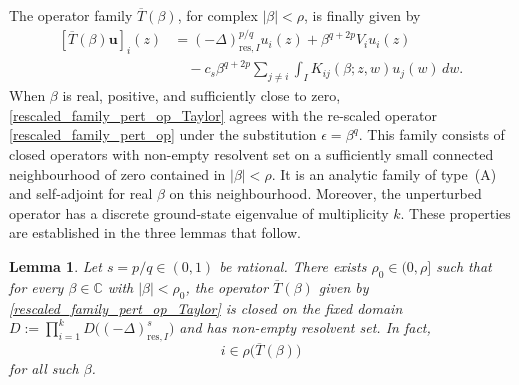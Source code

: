 \documentclass[preprint,12pt]{elsarticle}
\newcommand{\fvect}[1]{\mathbf{#1}}
\newtheorem{lemma}[theorem]{Lemma}
\begin{document}
The operator family $\overline{T}(\beta)$, for complex
$|\beta|<\rho$, is finally given by
\begin{align}\label{rescaled_family_pert_op_Taylor}
    [\overline{T}(\beta)\fvect{u}]_i(z)
    &=
    (-\Delta)^{p/q}_{\mathrm{res},I}u_i(z)
    +\beta^{q+2p}V_i u_i(z)
    \nonumber\\
    &\quad
    -c_s\beta^{q+2p}
    \sum_{j\neq i}
    \int_I
    K_{ij}(\beta;z,w)u_j(w)\,dw.
\end{align}
When $\beta$ is real, positive, and sufficiently close to zero,
\eqref{rescaled_family_pert_op_Taylor} agrees with the re-scaled
operator \eqref{rescaled_family_pert_op} under the substitution
$\epsilon=\beta^q$. This family consists of closed operators with non-empty resolvent set on a sufficiently small connected neighbourhood of zero contained in $|\beta|<\rho$. It is an analytic family of type~(A) and self-adjoint for real $\beta$ on this neighbourhood. Moreover, the unperturbed operator has a discrete ground-state eigenvalue of multiplicity $k$. These properties are established in the three lemmas that follow.\\

\begin{lemma}
\label{rescaled_pert_op_nonempty_resolvent}
Let $s=p/q\in(0,1)$ be rational. There exists
$\rho_0\in(0,\rho]$ such that for every $\beta\in\mathbb{C}$ with
$|\beta|<\rho_0$, the operator $\overline{T}(\beta)$ given by
\eqref{rescaled_family_pert_op_Taylor} is closed on the fixed domain $D:=\prod_{i=1}^k D\bigl((-\Delta)^s_{\mathrm{res},I}\bigr)$
and has non-empty resolvent set. In fact,
\[
    i\in\rho\bigl(\overline{T}(\beta)\bigr)
\]
for all such $\beta$.
\end{lemma}
\end{document}
